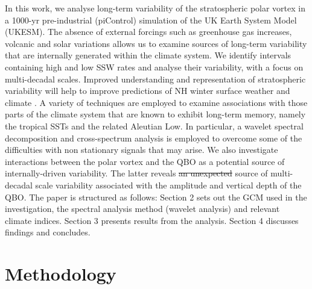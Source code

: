 \documentclass[wcd, manuscript]{copernicus}
\providecommand{\DIFadd}[1]{{\protect\color{blue}\uwave{#1}}} %
\providecommand{\DIFdel}[1]{{\protect\color{red}\sout{#1}}}                      %
\providecommand{\DIFaddbegin}{} %
\providecommand{\DIFaddend}{} %
\providecommand{\DIFdelbegin}{} %
\providecommand{\DIFdelend}{} %
\begin{document}
In this work, we analyse long-term variability of the stratospheric polar vortex in a 1000-yr pre-industrial (piControl) simulation of the UK Earth System Model (UKESM). The absence of external forcings such as greenhouse gas increases, volcanic and solar variations allows us to examine sources of long-term variability that are internally generated within the climate system. We identify intervals containing high and low SSW rates and analyse their variability, with a focus on multi-decadal scales. Improved  understanding and representation of stratospheric variability will help to improve predictions of NH winter surface weather and climate \citep{Kidston2015,gray2020}. A variety of techniques are employed to examine associations with those parts of the climate system that are known to exhibit long-term memory, namely the tropical SSTs and the related Aleutian Low. In particular, a wavelet spectral decomposition and cross-spectrum analysis is employed to overcome some of the difficulties with non stationary signals that may arise. We also investigate interactions between the polar vortex and the QBO as a potential source of internally-driven variability. The latter reveals \DIFdelbegin \DIFdel{an unexpected }\DIFdelend \DIFaddbegin \DIFadd{a }\DIFaddend source of multi-decadal scale variability associated with the amplitude and vertical depth of the QBO. The paper is structured as follows: Section 2 sets out the GCM used in the investigation, the spectral analysis method (wavelet analysis) and relevant climate indices. Section 3 presents results from the analysis. Section 4 discusses findings and concludes.

\section{Methodology}
\end{document}

